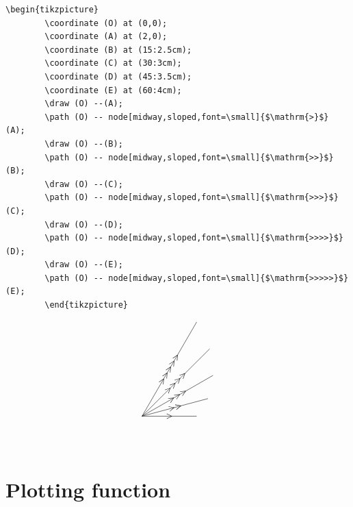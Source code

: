 \documentclass[lualatex]{jlreq}
\begin{document}
\begin{minipage}{0.68 \textwidth}
    \begin{lstlisting}[language={[LaTeX] TeX},
        firstnumber=1,breaklines=true,gobble=8]
        \begin{tikzpicture}
        \coordinate (O) at (0,0);
        \coordinate (A) at (2,0);
        \coordinate (B) at (15:2.5cm);
        \coordinate (C) at (30:3cm);
        \coordinate (D) at (45:3.5cm);
        \coordinate (E) at (60:4cm);
        \draw (O) --(A);
        \path (O) -- node[midway,sloped,font=\small]{$\mathrm{>}$} (A);
        \draw (O) --(B);
        \path (O) -- node[midway,sloped,font=\small]{$\mathrm{>>}$} (B);
        \draw (O) --(C);
        \path (O) -- node[midway,sloped,font=\small]{$\mathrm{>>>}$} (C);
        \draw (O) --(D);
        \path (O) -- node[midway,sloped,font=\small]{$\mathrm{>>>>}$} (D);
        \draw (O) --(E);
        \path (O) -- node[midway,sloped,font=\small]{$\mathrm{>>>>>}$} (E);
        \end{tikzpicture}
\end{lstlisting}
\end{minipage}
\hfill
\begin{minipage}{0.28 \textwidth}
    \[
        \begin{tikzpicture}
        \coordinate (O) at (0,0);
        \coordinate (A) at (2,0);
        \coordinate (B) at (15:2.5cm);
        \coordinate (C) at (30:3cm);
        \coordinate (D) at (45:3.5cm);
        \coordinate (E) at (60:4cm);
        \draw (O) --(A);
        \path (O) -- node[midway,sloped,font=\small]{$\mathrm{>}$} (A);
        \draw (O) --(B);
        \path (O) -- node[midway,sloped,font=\small]{$\mathrm{>>}$} (B);
        \draw (O) --(C);
        \path (O) -- node[midway,sloped,font=\small]{$\mathrm{>>>}$} (C);
        \draw (O) --(D);
        \path (O) -- node[midway,sloped,font=\small]{$\mathrm{>>>>}$} (D);
        \draw (O) --(E);
        \path (O) -- node[midway,sloped,font=\small]{$\mathrm{>>>>>}$} (E);
        \end{tikzpicture}
    \]
\end{minipage}
\\[1em]

\section{Plotting function}
\end{document}
